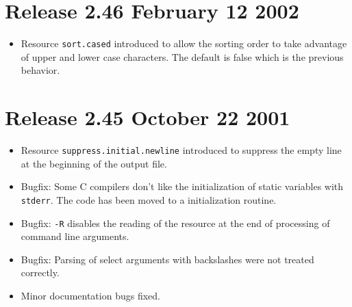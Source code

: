 \documentclass[11pt,a4paper]{scrartcl}
\newcommand\rsc[1]{\texttt{#1}}
\newenvironment{Release}[2]{%
  \def\tmp{#2}%
  \section*{Release #1 \ifx\tmp\empty\else{\normalsize[#2]}\fi}
  \begin{itemize}
}{\end{itemize}}
\newenvironment{Fix}[1]{\item }{}
\newenvironment{New}[1]{\item }{}
\newenvironment{Doc}[1]{\item }{}
\begin{document}
\begin{multicols}
 \begin{Release}{2.46}{February 12 2002}
  \begin{New}{gene}
    Resource \rsc{sort.cased} introduced to allow the sorting order to
    take advantage of upper and lower case characters. The default is
    false which is the previous behavior.
  \end{New}
 \end{Release}

 \begin{Release}{2.45}{October 22 2001}
  \begin{New}{gene}
    Resource \rsc{suppress.initial.newline} introduced to suppress the
    empty line at the beginning of the output file.
  \end{New}
  \begin{Fix}{gene}
    Bugfix: Some C compilers don't like the initialization of static
    variables with \texttt{stderr}. The code has been moved to a
    initialization routine.
  \end{Fix}
  \begin{Fix}{gene}
    Bugfix: \texttt{-R} disables the reading of the resource at the
    end of processing of command line arguments.
  \end{Fix}
  \begin{Fix}{gene}
    Bugfix: Parsing of select arguments with backslashes were not treated
    correctly.
  \end{Fix}
  \begin{Doc}{gene}
    Minor documentation bugs fixed.
  \end{Doc}
 \end{Release}


\end{multicols}
\end{document}
